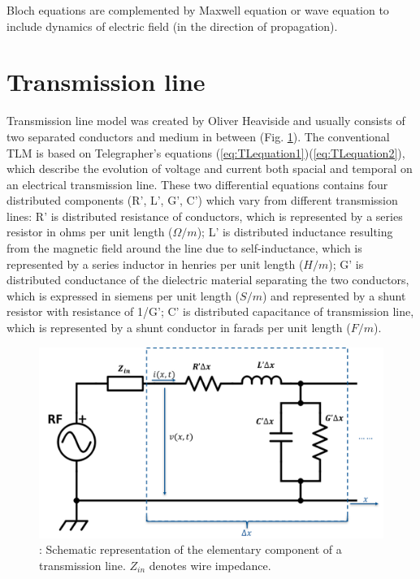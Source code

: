 \documentclass[11pt,final]{scrbook}
\begin{document}
Bloch equations are complemented by Maxwell equation or wave equation to include dynamics of electric field (in the direction of propagation). 
\section{Transmission line}
Transmission line model was created by Oliver Heaviside \cite{heaviside2008electromagnetic} and usually consists of two separated conductors and medium in between (Fig. \ref{fig:TLcircuit}). The conventional TLM is based on Telegrapher's equations (\ref{eq:TLequation1})(\ref{eq:TLequation2}), which describe the evolution of voltage and current both spacial and temporal on an electrical transmission line. These two differential equations contains four distributed components (R', L', G', C') which vary from different transmission lines: R' is distributed resistance of conductors, which is represented by a series resistor in ohms per unit length ($\Omega /m$); L' is distributed inductance resulting from the magnetic field around the line due to self-inductance, which is represented by a series inductor in henries per unit length ($H/m$); G' is distributed conductance of the dielectric material separating the two conductors, which is expressed in siemens per unit length ($S/m$) and represented by a shunt resistor with resistance of 1/G'; C' is distributed capacitance of transmission line, which is represented by a shunt conductor in farads per unit length ($F/m$).
\begin{figure}[htbp]
\begin{center}
\includegraphics[scale=0.4]{images/TLcircuit}
\caption{: Schematic representation of the elementary component of a transmission line. $Z_{in}$ denotes wire impedance.}
\label{fig:TLcircuit}
\end{center}
\end{figure}
\end{document}
